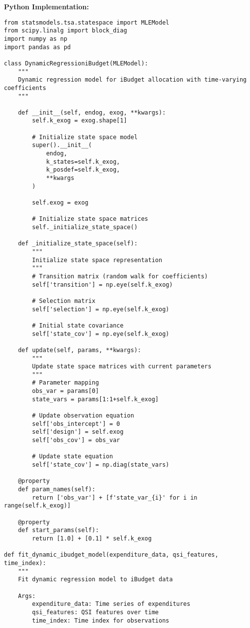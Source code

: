 \documentclass[12pt]{article}
\begin{document}
\textbf{Python Implementation:}
\begin{lstlisting}
from statsmodels.tsa.statespace import MLEModel
from scipy.linalg import block_diag
import numpy as np
import pandas as pd

class DynamicRegressioniBudget(MLEModel):
    """
    Dynamic regression model for iBudget allocation with time-varying coefficients
    """
    
    def __init__(self, endog, exog, **kwargs):
        self.k_exog = exog.shape[1]
        
        # Initialize state space model
        super().__init__(
            endog, 
            k_states=self.k_exog,
            k_posdef=self.k_exog,
            **kwargs
        )
        
        self.exog = exog
        
        # Initialize state space matrices
        self._initialize_state_space()
    
    def _initialize_state_space(self):
        """
        Initialize state space representation
        """
        # Transition matrix (random walk for coefficients)
        self['transition'] = np.eye(self.k_exog)
        
        # Selection matrix
        self['selection'] = np.eye(self.k_exog)
        
        # Initial state covariance
        self['state_cov'] = np.eye(self.k_exog)
        
    def update(self, params, **kwargs):
        """
        Update state space matrices with current parameters
        """
        # Parameter mapping
        obs_var = params[0]
        state_vars = params[1:1+self.k_exog]
        
        # Update observation equation
        self['obs_intercept'] = 0
        self['design'] = self.exog
        self['obs_cov'] = obs_var
        
        # Update state equation
        self['state_cov'] = np.diag(state_vars)
        
    @property
    def param_names(self):
        return ['obs_var'] + [f'state_var_{i}' for i in range(self.k_exog)]
    
    @property
    def start_params(self):
        return [1.0] + [0.1] * self.k_exog

def fit_dynamic_ibudget_model(expenditure_data, qsi_features, time_index):
    """
    Fit dynamic regression model to iBudget data
    
    Args:
        expenditure_data: Time series of expenditures
        qsi_features: QSI features over time
        time_index: Time index for observations
    

\end{lstlisting}
\end{document}
